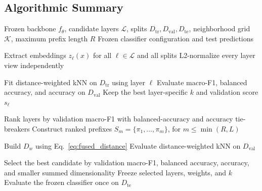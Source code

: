 \documentclass[main.tex]{subfiles}
\begin{document}
\subsection{Algorithmic Summary}

\begin{algorithm}[H]
\caption{HMDF-kNN validation-controlled multilayer distance fusion}
\label{alg:proposed}
\begin{algorithmic}[1]
\Require Frozen backbone \(f_{\theta}\), candidate layers \(\mathcal{L}\), splits \(D_{\mathrm{tr}},D_{\mathrm{val}},D_{\mathrm{te}}\), neighborhood grid \(\mathcal{K}\), maximum prefix length \(R\)
\Ensure Frozen classifier configuration and test predictions

\State Extract embeddings \(z_{\ell}(x)\) for all \(\ell\in\mathcal{L}\) and all splits
\State L2-normalize every layer view independently

    \State Fit distance-weighted kNN on \(D_{\mathrm{tr}}\) using layer \(\ell\)
    \State Evaluate macro-F1, balanced accuracy, and accuracy on \(D_{\mathrm{val}}\)
  \EndFor
  \State Keep the best layer-specific \(k\) and validation score \(s_{\ell}\)
\EndFor

\State Rank layers by validation macro-F1 with balanced-accuracy and accuracy tie-breakers
\State Construct ranked prefixes \(S_m=\{\pi_1,\ldots,\pi_m\}\), for \(m\leq \min(R,L)\)

    \State Build \(D_w\) using Eq.~\eqref{eq:fused_distance}
      \State Evaluate distance-weighted kNN on \(D_{\mathrm{val}}\)
    \EndFor
  \EndFor
\EndFor

\State Select the best candidate by validation macro-F1, balanced accuracy, accuracy, and smaller summed dimensionality
\State Freeze selected layers, weights, and \(k\)
\State Evaluate the frozen classifier once on \(D_{\mathrm{te}}\)

\end{algorithmic}
\end{algorithm}
\end{document}
